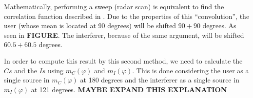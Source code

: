 Mathematically, performing a sweep (radar scan) is equivalent to find the correlation function described in . Due to the properties of this ``convolution'', the user (whose mean is located at 90 degrees) will be shifted $90 + 90$ degrees. As seen in \textbf{FIGURE}. The interferer, because of the same argument, will be shifted $60.5 + 60.5$ degrees.

In order to compute this result by this second method, we need to calculate the $Cs$ and the $Is$ using $m_{C}(\varphi)$ and $m_{I}(\varphi)$. This is done considering the user as a single source in $m_{C}(\varphi)$ at 180 degrees and the interferer as a single source in $m_{I}(\varphi)$ at 121 degrees. \textbf{MAYBE EXPAND THIS EXPLANATION}